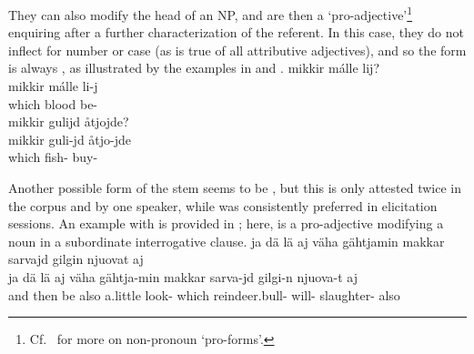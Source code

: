 They can also modify the head of an NP, and are then a ‘pro-adjective’\footnote{Cf.~\citet[31--34]{SchachterShopen2007} for more on non-pronoun ‘pro-forms’.} enquiring after a further characterization of the referent. In this case, they do not inflect for number or case (as is true of all attributive adjectives), and so the form is always , as illustrated by the examples in  and . %
\ea\label{QpronounDEMGeneralEx3}
\glll	mikkir málle lij?\\
	mikkir málle li-j\\
	which blood\BS{} be-\\\nopagebreak
{}	
\z
\ea\label{QpronounDEMGeneralEx4}
\glll	mikkir gulijd åtjojde?\\
	mikkir guli-jd åtjo-jde\\
	which fish- buy-\\\nopagebreak
{}	
\z

Another possible form of the stem seems to be , but this is only attested twice in the corpus and by one speaker, while  was consistently preferred in elicitation sessions. %
An example with  is provided in ; here,  is a pro-adjective modifying a noun in a subordinate interrogative clause. 
\ea\label{QpronounDEMGeneralEx5}
\glll	ja dä lä aj väha gähtjamin makkar sarvajd gilgin njuovat aj\\
	ja dä lä aj väha gähtja-min makkar sarva-jd gilgi-n njuova-t aj\\
	and then be\BS{} also a.little look- which reindeer.bull- will- slaughter- also\\\nopagebreak
{}	
\z


